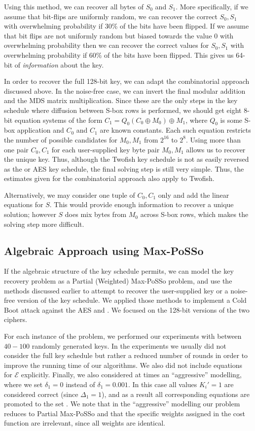 Using this method, we can recover all bytes of $S_0$ and $S_1$.
More specifically, if we assume that bit-flips are uniformly random, we can recover the correct $S_0,S_1$ with overwhelming probability if 30\% of the bits have been flipped. If we assume that bit flips are not uniformly random but biased towards the value $0$ with overwhelming probability then we can recover the correct values for $S_0,S_1$ with overwhelming probability if 60\% of the bits have been flipped. This gives us 64-bit of \emph{information} about the key.

In order to recover the full 128-bit key, we can adapt the combinatorial approach discussed above. In the noise-free case, we can invert the final modular addition and the MDS matrix multiplication. Since these are the only steps in the key schedule where diffusion between S-box rows is performed, we should get eight 8-bit equation systems of the form $C_1 = Q_0(C_0 \oplus M_0) \oplus M_1$, where $Q_0$ is some S-box application and $C_0$ and $C_1$ are known constants. Each such equation restricts the number of possible candidates for $M_0,M_1$ from $2^{16}$ to $2^{8}$. Using more than one pair $C_0,C_1$ for each user-supplied key byte pair $M_0,M_1$ allows us to recover the unique key. Thus, although the Twofish key schedule is not as easily reversed as the \Serpent or AES key schedule, the final solving step is still very simple. 
Thus, the estimates given for the combinatorial approach also apply to Twofish.

Alternatively, we may consider one tuple of $C_{0},C_{1}$ only and add the linear equations for $S$. This would provide enough information to recover a unique solution; however $S$ does mix bytes from $M_0$ across S-box rows, which makes the solving step more difficult.


\subsection{Algebraic Approach using Max-PoSSo}
If the algebraic structure of the key schedule permits, we can model the \coldboot key recovery problem as a Partial (Weigh\-ted) Max-PoSSo problem, and use the methods
discussed earlier to attempt to recover the user-supplied key or a noise-free version of the key schedule. 
We applied those methods to implement a Cold Boot attack against the AES and \Serpent. We focused on the 128-bit versions of the two ciphers.

For each instance of the problem, we performed our experiments with between $40-100$ randomly generated keys. In the experiments we usually did not consider the full key schedule but rather a reduced number of rounds in order to improve the running time of our algorithms. We also did not include equations for $\mathcal{E}$ explicitly. Finally, we also considered at times an ``aggressive'' modelling, where we set $\delta_1=0$ instead of $\delta_1 = 0.001$. In this case all values $K_i' = 1$ are considered correct (since $\Delta_1=1$), and as a result all corresponding equations are promoted to the set \Hs.
We note that in the ``aggressive'' modelling our problem reduces to Partial Max-PoSSo and that the specific weights assigned in the cost function are irrelevant, since all weights are identical.

